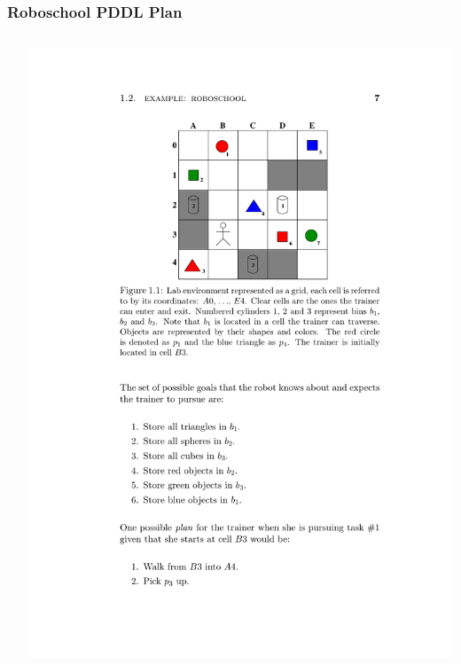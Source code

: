 \documentclass{beamer}
\begin{document}
	\begin{frame}[c]\frametitle{Roboschool PDDL Plan}
		\begin{columns}
			\begin{column}{0.5\textwidth}
			
			\end{column}
			\begin{column}{0.5\textwidth}
			\includegraphics[width=.9\textwidth]{fig/roboschool-example.pdf}\\
			\end{column}
		\end{columns}
	\end{frame}
	
\end{document}

